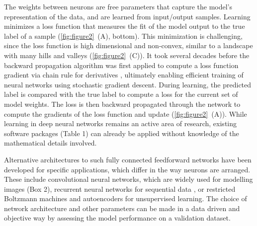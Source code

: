 The weights between neurons are free parameters that capture the model's representation of the data, and are learned from input/output samples. Learning minimizes a loss function that measures the fit of the model output to the true label of a sample (\autoref{fig:figure2}~(A), bottom). This minimization is challenging, since the loss function is high dimensional and non-convex, similar to a landscape with many hills and valleys (\autoref{fig:figure2}~(C)). It took several decades before the backward propagation algorithm was first applied to compute a loss function gradient via chain rule for derivatives \citep{rumelhart_learning_1988}, ultimately enabling efficient training of neural networks using stochastic gradient descent. During learning, the predicted label is compared with the true label to compute a loss for the current set of model weights. The loss is then backward propagated through the network to compute the gradients of the loss function and update (\autoref{fig:figure2}~(A)). While learning in deep neural networks remains an active area of research, existing software packages (Table 1) can already be applied without knowledge of the mathematical details involved.

Alternative architectures to such fully connected feedforward networks have been developed for specific applications, which differ in the way neurons are arranged. These include convolutional neural networks, which are widely used for modelling images (Box 2), recurrent neural networks for sequential data \citep{lipton_critical_2015,sutskever_training_2013}, or restricted Boltzmann machines \citep{hinton_practical_2012,salakhutdinov_efficient_2010} and autoencoders \citep{alain_regularized_2012,hinton_reducing_2006,kingma_auto-encoding_2013} for unsupervised learning. The choice of network architecture and other parameters can be made in a data driven and objective way by assessing the model performance on a validation dataset.


